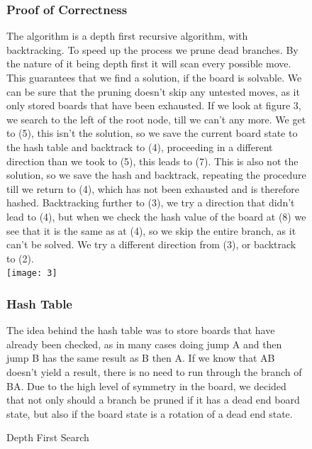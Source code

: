 \documentclass[11pt]{article}
\begin{document}
\newpage
\begin{figure}
\subsubsection*{Proof of Correctness}
The algorithm is a depth first recursive algorithm, with backtracking. To speed up the process we prune dead branches. By the nature of it being depth first it will scan every possible move. This guarantees that we find a solution, if the board is solvable. We can be sure that the pruning doesn't skip any untested moves, as it only stored boards that have been exhausted. 
If we look at figure 3, we search to the left of the root node, till we can't any more. We get to (5), this isn't the solution, so we save the current board state to the hash table and backtrack to (4), proceeding in a different direction than we took to (5), this leads to (7). This is also not the solution, so we save the hash and backtrack, repeating the procedure till we return to (4), which has not been exhausted and is therefore hashed. 
Backtracking further to (3), we try a direction that didn't lead to (4), but when we check the hash value of the board at (8) we see that it is the same as at (4), so we skip the entire branch, as it can't be solved. We try a different direction from (3), or backtrack to (2).
\newline\\
\texttt{[image: 3]}
\caption{Depth First Search} 
\label{fig: 3}
\subsubsection*{Hash Table}
The idea behind the hash table was to store boards that have already been checked, as in many cases doing jump A and then jump B has the same result as B then A. If we know that AB doesn't yield a result, there is no need to run through the branch of BA.
Due to the high level of symmetry in the board, we decided that not only should a branch be pruned if it has a dead end board state, but also if the board state is a rotation of a dead end state. 
\end{figure}
\newpage
\end{document}
